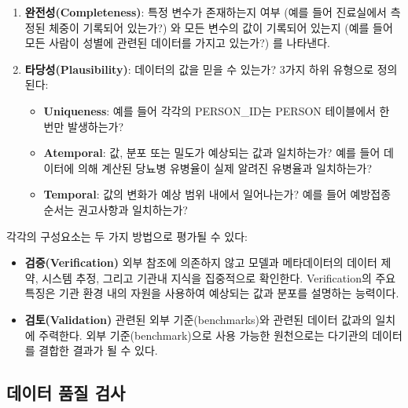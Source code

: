 \documentclass[10.5pt]{book}
\providecommand{\tightlist}{%
  \setlength{\itemsep}{0pt}\setlength{\parskip}{0pt}}
\theoremstyle{definition}
\theoremstyle{definition}
\theoremstyle{definition}
\theoremstyle{remark}
\begin{document}
\begin{enumerate}
\def\labelenumi{\arabic{enumi}.}
\setcounter{enumi}{1}
\tightlist
\item
  \textbf{완전성(Completeness)}: 특정 변수가 존재하는지 여부 (예를 들어
  진료실에서 측정된 체중이 기록되어 있는가?) 와 모든 변수의 값이
  기록되어 있는지 (예를 들어 모든 사람이 성별에 관련된 데이터를 가지고
  있는가?) 를 나타낸다.
\item
  \textbf{타당성(Plausibility)}: 데이터의 값을 믿을 수 있는가? 3가지
  하위 유형으로 정의된다:

  \begin{itemize}
  \tightlist
  \item
    \textbf{Uniqueness}: 예를 들어 각각의 PERSON\_ID는 PERSON 테이블에서
    한 번만 발생하는가?
  \item
    \textbf{Atemporal}: 값, 분포 또는 밀도가 예상되는 값과 일치하는가?
    예를 들어 데이터에 의해 계산된 당뇨병 유병율이 실제 알려진 유병율과
    일치하는가?
  \item
    \textbf{Temporal}: 값의 변화가 예상 범위 내에서 일어나는가? 예를
    들어 예방접종 순서는 권고사항과 일치하는가?
  \end{itemize}

   
\end{enumerate}

각각의 구성요소는 두 가지 방법으로 평가될 수 있다:

\begin{itemize}
\tightlist
\item
  \textbf{검증(Verification)} 외부 참조에 의존하지 않고 모델과
  메타데이터의 데이터 제약, 시스템 추정, 그리고 기관내 지식을 집중적으로
  확인한다. Verification의 주요 특징은 기관 환경 내의 자원을 사용하여
  예상되는 값과 분포를 설명하는 능력이다.
\item
  \textbf{검토(Validation)} 관련된 외부 기준(benchmarks)와 관련된 데이터
  값과의 일치에 주력한다. 외부 기준(benchmark)으로 사용 가능한
  원천으로는 다기관의 데이터를 결합한 결과가 될 수 있다.
\end{itemize}

 

\subsection{데이터 품질 검사}\label{--}
\end{document}
